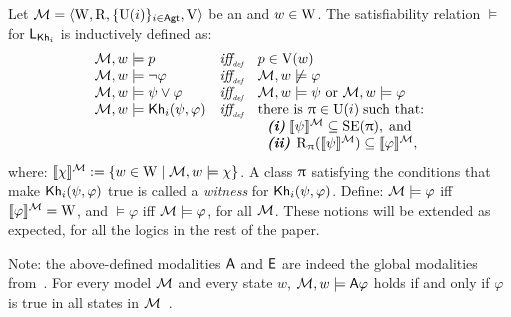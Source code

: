 \begin{definition}\label{def:sem-esm}
Let $\mathcal{M}=\langle \operatorname{W},\operatorname{R},\{\operatorname{U}(i)\}_{i\in{\rm \sf Agt}},\operatorname{V} \rangle$ be an \ults and $w \in \operatorname{W}$.
The satisfiability relation $\models$ for $\mathsf{L}_{{\sf Kh}_i}$ is inductively defined as:
\[
\begin{array}{l@{\ \ \ }c@{\ \ \  }l}
\modults, w \models p & \iffdef & p \in \V(w) \\
\modults, w \models \neg\varphi & \iffdef & \modults, w \not\models \varphi \\
\modults, w \models \psi\vee\varphi & \iffdef & \modults, w \models \psi \mbox{ or }\modults, w \models \varphi \\
\modults, w \models \khi(\psi,\varphi) & \iffdef & \text{there is } \plans \in \Unc(i) \;\text{such that:} \\
& & \ \ \text{\bfseries \itshape (i)} \; \truthset{\modults}{\psi} \subseteq \stexec(\plans),\; \text{and} \\
& & \ \ \text{\bfseries \itshape (ii)} \; \R_\plans(\truthset{\modults}{\psi}) \subseteq \truthset{\modults}{\varphi},
\end{array}
\]
where: $\llbracket \chi \rrbracket^{\mathcal{M}} := \{ w\in\operatorname{W} \mid \mathcal{M},w\models\chi \}$. 
A class $\uppi$ satisfying the conditions that make ${\sf Kh}_i(\psi,\varphi)$ true is called a \emph{witness} for ${\sf Kh}_i(\psi,\varphi)$. 
Define: $\mathcal{M}\models\varphi$ iff  $\llbracket \varphi \rrbracket^{\mathcal{M}}=\operatorname{W}$, and $\models\varphi$ iff $\mathcal{M}\models\varphi$, for all \ults $\mathcal{M}$. These notions will be extended as expected, for all the logics in the rest of the paper.
\end{definition}

Note: the above-defined modalities ${\sf A}$ and ${\sf E}$ are indeed the global modalities from~\cite{GorankoP92}. For every model $\mathcal{M}$ and every state $w$, $\mathcal{M},w\models{\sf A}\varphi$ holds if and only if $\varphi$ is true in all states in $\mathcal{M}$~\cite{AFSVQ21}. %


